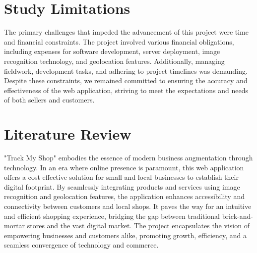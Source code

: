 \section{Study Limitations}
The primary challenges that impeded the advancement of this project were time and financial constraints. The project involved various financial obligations, including expenses for software development, server deployment, image recognition technology, and geolocation features. Additionally, managing fieldwork, development tasks, and adhering to project timelines was demanding. Despite these constraints, we remained committed to ensuring the accuracy and effectiveness of the web application, striving to meet the expectations and needs of both sellers and customers.

\section{Literature Review}
"Track My Shop" embodies the essence of modern business augmentation through technology. In an era where online presence is paramount, this web application offers a cost-effective solution for small and local businesses to establish their digital footprint. By seamlessly integrating products and services using image recognition and geolocation features, the application enhances accessibility and connectivity between customers and local shops. It paves the way for an intuitive and efficient shopping experience, bridging the gap between traditional brick-and-mortar stores and the vast digital market. The project encapsulates the vision of empowering businesses and customers alike, promoting growth, efficiency, and a seamless convergence of technology and commerce.


